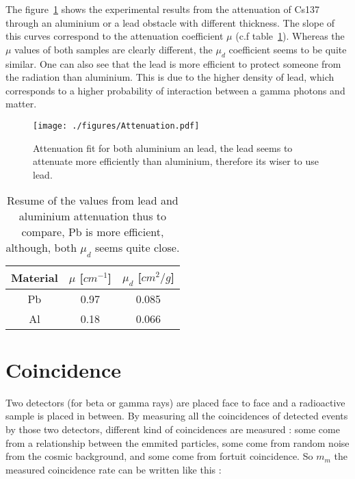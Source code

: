 \documentclass[a4paper,12pt,oneside]{article}
\begin{document}
The figure~\ref{fig:attenuation} shows the experimental results from the attenuation of Cs137 through an aluminium or a lead obstacle with different thickness. The slope of this curves correspond to the attenuation coefficient $\mu$ (c.f table~\ref{tab:attenuation}).
Whereas the $\mu$ values of both samples are clearly different, the $\mu_d$ coefficient seems to be quite similar. One can also see that the lead is more efficient to protect someone from the radiation than aluminium. This is due to the higher density of lead, which corresponds to a higher probability of interaction between a gamma photons and matter.

\begin{figure}[h!]
	\begin{center}
	\texttt{[image: ./figures/Attenuation.pdf]}
	\caption{Attenuation fit for both aluminium an lead, the lead seems to attenuate more efficiently than aluminium, therefore its wiser to use lead.} \label{fig:attenuation}
	\end{center}
\end{figure}

\begin{table}[h!]
\centering
	\begin{tabular}{|c|c|c|}
		 \hline
		Material & $\mu$ [$cm^{-1}$] & $\mu_d$ [$cm^2/g$]\\
		\hline
		Pb	& 0.97 & 0.085 \\
		Al	& 0.18 & 0.066 \\
			\hline
	\end{tabular}
	\caption{Resume of the values from lead and aluminium attenuation thus to compare, Pb is more efficient, although, both $\mu_d$ seems quite close.}
	\label{tab:attenuation}
\end{table}

\newpage
\section{Coincidence}

Two detectors (for beta or gamma rays) are placed face to face and a radioactive sample is placed in between. By measuring all the coincidences of detected events by those two detectors, different kind of coincidences are measured : some come from a relationship between the emmited particles, some come from random noise from the cosmic background, and some come from fortuit coincidence. So $m_m$ the measured coincidence rate can be written like this :
\end{document}
